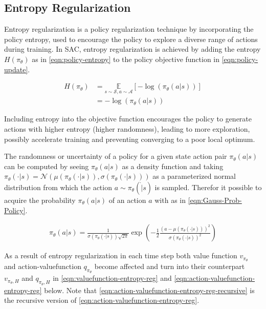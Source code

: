 \subsection{Entropy Regularization}\label{sec:entropy-regularization}

Entropy regularization is a policy regularization technique by incorporating the policy entropy, used to encourage the policy to explore a diverse range of actions during training. In SAC, entropy regularization is achieved by adding the entropy $H(\pi_\theta)$ as in \eqref{eqn:policy-entropy} to the policy objective function in \eqref{eqn:policy-update}.

\begin{align}
	H(\pi_\theta) &= \underset{s\sim\mathcal{S}, a\sim\mathcal{A}}{\mathbb{E}}\left[- \log(\pi_\theta(a|s))\right] \nonumber \\
	&= -\log(\pi_\theta(a|s)) \label{eqn:policy-entropy}
\end{align}  

Including entropy into the objective function encourages the policy to generate actions with higher entropy (higher randomness), leading to more exploration, possibly accelerate training and preventing converging to a poor local optimum.  

The randomness or uncertainty of a policy for a given state action pair $\pi_\theta(a|s)$ can be computed  by seeing  $\pi_\theta(a|s)$ as a density function and taking $\pi_\theta(\cdot|s) = \mathcal{N}\left(\mu(\pi_\theta(\cdot|s)), \sigma(\pi_\theta(\cdot|s))\right)$ as a parameterized normal distribution from which the action $a \sim \pi_\theta(\dot|s)$ is sampled. Therefor it possible to acquire the probability $\pi_\theta(a|s)$ of an action $a$ with as in \eqref{eqn:Gauss-Prob-Policy}.

\begin{align}
	\pi_\theta(a|s) = \frac{1}{\sigma(\pi_\theta(\cdot|s)) \sqrt{2\pi}} \exp\left(-\frac{1}{2}\frac{(a -\mu(\pi_\theta(\cdot|s)))^2}{\sigma(\pi_\theta(\cdot|s))^2}\right) \label{eqn:Gauss-Prob-Policy}
\end{align}

As a result of entropy regularization in each time step both value function $v_{\pi_\theta}$ and action-valuefunction $q_{\pi_\theta}$ become affected and turn into their counterpart $v_{\pi_\theta, H}$ and $q_{\pi_\theta, H}$ in \eqref{eqn:valuefunction-entropy-reg} and \eqref{eqn:action-valuefunction-entropy-reg} below.  Note that \eqref{eqn:action-valuefunction-entropy-reg-recursive} is the recursive version of \eqref{eqn:action-valuefunction-entropy-reg}.

